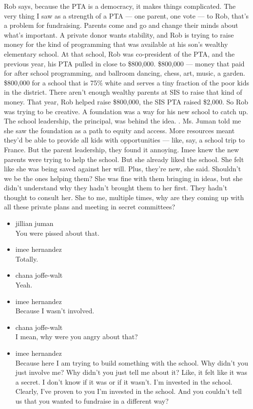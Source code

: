 Rob says, because the PTA is a democracy, it makes things complicated.
The very thing I saw as a strength of a PTA --- one parent, one vote ---
to Rob, that's a problem for fundraising. Parents come and go and change
their minds about what's important. A private donor wants stability, and
Rob is trying to raise money for the kind of programming that was
available at his son's wealthy elementary school. At that school, Rob
was co-president of the PTA, and the previous year, his PTA pulled in
close to \$800,000. \$800,000 --- money that paid for after school
programming, and ballroom dancing, chess, art, music, a garden.
\$800,000 for a school that is 75\% white and serves a tiny fraction of
the poor kids in the district. There aren't enough wealthy parents at
SIS to raise that kind of money. That year, Rob helped raise \$800,000,
the SIS PTA raised \$2,000. So Rob was trying to be creative. A
foundation was a way for his new school to catch up. The school
leadership, the principal, was behind the idea. . Ms. Juman told me she
saw the foundation as a path to equity and access. More resources meant
they'd be able to provide all kids with opportunities --- like, say, a
school trip to France. But the parent leadership, they found it
annoying. Imee knew the new parents were trying to help the school. But
she already liked the school. She felt like she was being saved against
her will. Plus, they're new, she said. Shouldn't we be the ones helping
them? She was fine with them bringing in ideas, but she didn't
understand why they hadn't brought them to her first. They hadn't
thought to consult her. She to me, multiple times, why are they coming
up with all these private plans and meeting in secret committees?

\begin{itemize}
\item
  jillian juman\\
  You were pissed about that.
\item
  imee hernandez\\
  Totally.
\item
  chana joffe-walt\\
  Yeah.
\item
  imee hernandez\\
  Because I wasn't involved.
\item
  chana joffe-walt\\
  I mean, why were you angry about that?
\item
  imee hernandez\\
  Because here I am trying to build something with the school. Why
  didn't you just involve me? Why didn't you just tell me about it?
  Like, it felt like it was a secret. I don't know if it was or if it
  wasn't. I'm invested in the school. Clearly, I've proven to you I'm
  invested in the school. And you couldn't tell us that you wanted to
  fundraise in a different way?
\end{itemize}

